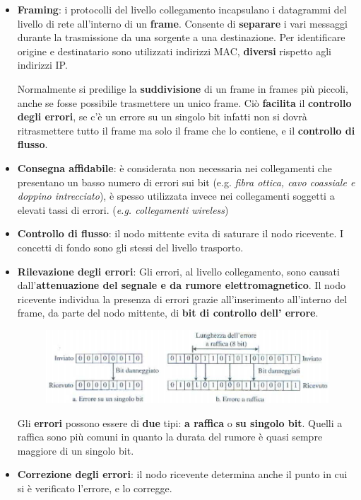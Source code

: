 \documentclass[11pt,a4paper,oneside]{book}
\theoremstyle{definition}
\begin{document}
\begin{itemize}
	\item \textbf{Framing}: i protocolli del livello collegamento incapsulano i datagrammi del livello di rete all’interno di un \textbf{frame}. Consente di \textbf{separare} i vari messaggi durante la trasmissione da una sorgente a una destinazione. Per identificare origine e destinatario sono utilizzati indirizzi MAC, \textbf{diversi} rispetto agli indirizzi IP.

	      Normalmente si predilige la \textbf{suddivisione} di un frame in frames più piccoli, anche se fosse possibile trasmettere un unico frame. Ciò \textbf{facilita} il \textbf{controllo degli errori}, se c'è un errore su un singolo bit infatti non si dovrà ritrasmettere tutto il frame ma solo il frame che lo contiene, e il \textbf{controllo di flusso}.
	\item \textbf{Consegna affidabile}: è considerata non necessaria nei collegamenti che presentano un basso numero di errori sui bit (e.g. \textit{fibra ottica, cavo coassiale e doppino intrecciato}), è spesso utilizzata invece nei collegamenti soggetti a elevati tassi di errori. (\textit{e.g. collegamenti wireless})
	\item \textbf{Controllo di flusso}: il nodo mittente evita di saturare il nodo ricevente. I concetti di fondo sono gli stessi del livello trasporto.
	\item \textbf{Rilevazione degli errori}: Gli errori, al livello collegamento, sono causati dall’\textbf{attenuazione del segnale e da rumore
		      elettromagnetico}. Il nodo ricevente individua la presenza di errori grazie all’inserimento all’interno del frame, da parte del nodo mittente, di \textbf{bit di controllo dell' errore}.

	      \begin{figure}[!h]
		      \includegraphics[scale=0.4]{Immagini/DLCerrors.png}
		      \centering
	      \end{figure}

	      Gli \textbf{errori} possono essere di \textbf{due} tipi: \textbf{a raffica} o \textbf{su singolo bit}. Quelli a raffica sono più comuni in quanto la durata del rumore è quasi sempre maggiore di un singolo bit.
	\item \textbf{Correzione degli errori}: il nodo ricevente determina anche il punto in cui si è verificato l’errore, e lo corregge.
\end{itemize}
\end{document}
